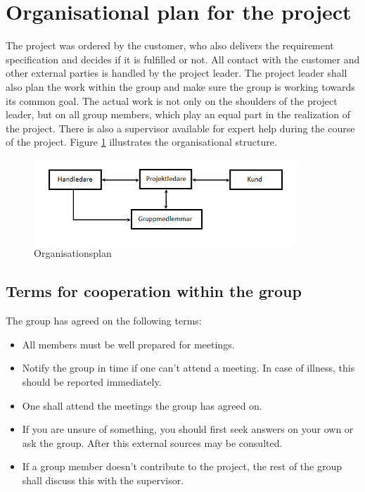 \section{Organisational plan for the project}
The project was ordered by the customer, who also delivers the requirement specification and decides if it is fulfilled or not. All contact with the customer and other external parties is handled by the project leader. The project leader shall also plan the work within the group and make sure the group is working towards its common goal. The actual work is not only on the shoulders of the project leader, but on all group members, which play an equal part in the realization of the project. There is also a supervisor available for expert help during the course of the project. Figure \ref{organisationsplan} illustrates the organisational structure.

\begin{figure}[H]
  \begin{center}
    \includegraphics[keepaspectratio=true,width=375px]{grafik/organisationsplan.png}
    \caption{Organisationsplan}
    \label{organisationsplan}
  \end{center}
\end{figure}

\subsection{Terms for cooperation within the group}
The group has agreed on the following terms:

\begin{itemize}
\item{All members must be well prepared for meetings.}
\item{Notify the group in time if one can't attend a meeting. In case of illness, this should be reported immediately.}
\item{One shall attend the meetings the group has agreed on.}
\item{If you are unsure of something, you should first seek answers on your own or ask the group. After this external sources may be consulted.}
\item{If a group member doesn't contribute to the project, the rest of the group shall discuss this with the supervisor.}
\end{itemize}

\newpage
